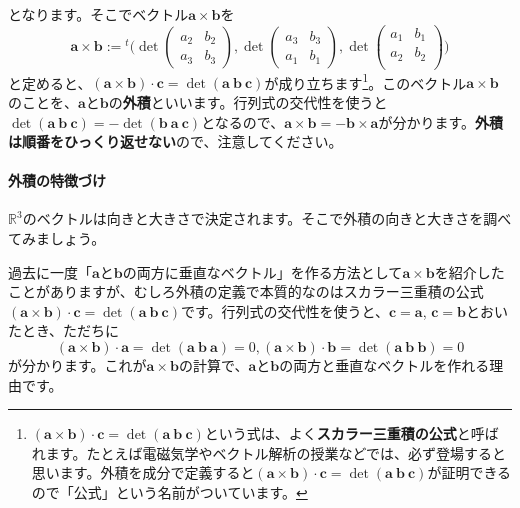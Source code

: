 となります。そこでベクトル$\bm{a} \times \bm{b}$を
\[
\bm{a} \times \bm{b}
:= 
{}^t\biggl(
\det
\begin{pmatrix}
a_2 & b_2 \\
a_3 & b_3
\end{pmatrix}, 
\det
\begin{pmatrix}
a_3 & b_3 \\
a_1 & b_1
\end{pmatrix}, 
\det
\begin{pmatrix}
a_1 & b_1 \\
a_2 & b_2 \\
\end{pmatrix}
\biggr)
\]
と定めると、$(\bm{a} \times \bm{b}) \cdot \bm{c} = \det(\bm{a} \ \bm{b} \ \bm{c})$が成り立ちます\footnote{$(\bm{a} \times \bm{b}) \cdot \bm{c} = \det(\bm{a} \ \bm{b} \ \bm{c})$という式は、よく\textbf{スカラー三重積の公式}と呼ばれます。たとえば電磁気学やベクトル解析の授業などでは、必ず登場すると思います。外積を成分で定義すると$(\bm{a} \times \bm{b}) \cdot \bm{c} = \det(\bm{a} \ \bm{b} \ \bm{c})$が証明できるので「公式」という名前がついています。}。このベクトル$\bm{a} \times \bm{b}$のことを、$\bm{a}$と$\bm{b}$の\textbf{外積}といいます。行列式の交代性を使うと$\det(\bm{a} \ \bm{b} \ \bm{c}) = - \det(\bm{b} \ \bm{a} \ \bm{c})$となるので、$\bm{a} \times \bm{b} = - \bm{b} \times \bm{a}$が分かります。\textbf{外積は順番をひっくり返せない}ので、注意してください。

\paragraph{外積の特徴づけ}

$\mathbb{R}^3$のベクトルは向きと大きさで決定されます。そこで外積の向きと大きさを調べてみましょう。

過去に一度「$\bm{a}$と$\bm{b}$の両方に垂直なベクトル」を作る方法として$\bm{a} \times \bm{b}$を紹介したことがありますが、むしろ外積の定義で本質的なのはスカラー三重積の公式$(\bm{a} \times \bm{b}) \cdot \bm{c} = \det(\bm{a} \ \bm{b} \ \bm{c})$です。行列式の交代性を使うと、$\bm{c} = \bm{a}$, $\bm{c} = \bm{b}$とおいたとき、ただちに
\[
(\bm{a} \times \bm{b}) \cdot \bm{a} = \det(\bm{a} \ \bm{b} \ \bm{a}) = 0, 
(\bm{a} \times \bm{b}) \cdot \bm{b} = \det(\bm{a} \ \bm{b} \ \bm{b}) = 0
\]
が分かります。これが$\bm{a} \times \bm{b}$の計算で、$\bm{a}$と$\bm{b}$の両方と垂直なベクトルを作れる理由です。


